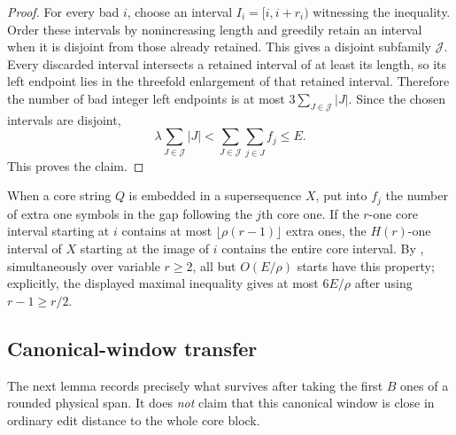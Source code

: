 \documentclass[11pt]{article}
\theoremstyle{remark}
\begin{document}
\begin{proof}
For every bad $i$, choose an interval $I_i=[i,i+r_i)$ witnessing the
inequality.  Order these intervals by nonincreasing length and greedily retain
an interval when it is disjoint from those already retained.  This gives a
disjoint subfamily $\mathcal J$.  Every discarded interval intersects a
retained interval of at least its length, so its left endpoint lies in the
threefold enlargement of that retained interval.  Therefore the number of bad
integer left endpoints is at most $3\sum_{J\in\mathcal J}|J|$.  Since the
chosen intervals are disjoint,
\[
 \lambda\sum_{J\in\mathcal J}|J|
 <\sum_{J\in\mathcal J}\sum_{j\in J}f_j\le E.
\]
This proves the claim.
\end{proof}

When a core string $Q$ is embedded in a supersequence $X$, put into $f_j$
the number of extra one symbols in the gap following the $j$th core one.
If the $r$-one core interval starting at $i$ contains at most
$\lfloor\rho(r-1)\rfloor$ extra ones, the $H(r)$-one interval of $X$ starting
at the image of $i$ contains the entire core interval.  By
, simultaneously over variable $r\ge2$, all but
$O(E/\rho)$ starts have this property; explicitly, the displayed maximal
inequality gives at most $6E/\rho$ after using $r-1\ge r/2$.

\subsection{Canonical-window transfer}

The next lemma records precisely what survives after taking the first $B$
ones of a rounded physical span.  It does \emph{not} claim that this canonical
window is close in ordinary edit distance to the whole core block.
\end{document}
